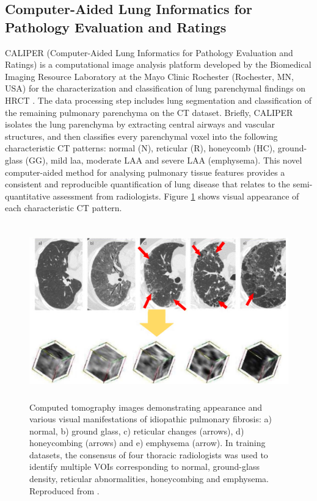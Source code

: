 \subsection{Computer-Aided Lung Informatics for Pathology Evaluation and Ratings} \label{CALIPERIntroduction}
CALIPER (Computer-Aided Lung Informatics for Pathology Evaluation and Ratings) is a computational image analysis platform developed by the Biomedical Imaging Resource Laboratory at the Mayo Clinic Rochester (Rochester, MN, USA) for the characterization and classification of lung parenchymal findings on HRCT \citep{maldonado2013automated,bartholmai2013quantitative,raghunath2014quantitative}. The data processing step includes lung segmentation and classification of the remaining pulmonary parenchyma on the CT dataset. Briefly, CALIPER isolates the lung parenchyma by extracting central airways and vascular structures, and then classifies every parenchymal voxel into the following characteristic CT patterns: normal (N), reticular (R), honeycomb (HC), ground-glass (GG), mild \gls{laa}, moderate LAA and severe LAA (emphysema). This novel computer-aided method for analysing pulmonary tissue features provides a consistent and reproducible quantification of lung disease that relates to the semi-quantitative assessment from radiologists\citep{maldonado2013automated}. Figure \ref{fig:CALIPERPatterns} shows visual appearance of each characteristic CT pattern.

\begin{figure}[htbp]
  \centering 
  \includegraphics[height=3.0in]{QuantitativeAnalysis/Image/CALIPERPatterns.png}
  \caption{Computed tomography images demonstrating appearance and various visual manifestations of idiopathic pulmonary fibrosis: a) normal, b) ground glass, c) reticular changes (arrows), d) honeycombing (arrows) and e) emphysema (arrow). In training datasets, the consensus of four thoracic radiologists was used to identify multiple VOIs corresponding to normal, ground-glass density, reticular abnormalities, honeycombing and emphysema. Reproduced from \citep{maldonado2013automated}.}
  \label{fig:CALIPERPatterns}
\end{figure}

